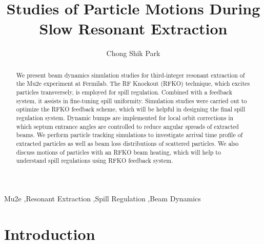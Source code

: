 \documentclass[review,1p,number,fleqn,a4paper]{elsarticle}
\begin{document}
\let\WriteBookmarks\relax
\def\floatpagepagefraction{1}
\def\textpagefraction{.001}

\title{Studies of Particle Motions During Slow Resonant Extraction}
\author[1,2]{Chong Shik Park}



\begin{abstract}
We present beam dynamics simulation studies for third-integer resonant extraction of the Mu2e experiment at Fermilab. 
The RF Knockout (RFKO) technique, which excites particles transversely, is employed for spill regulation. Combined with a feedback system, it assists in fine-tuning spill uniformity. Simulation studies were carried out to optimize the RFKO feedback scheme, which will be helpful in designing the final spill regulation system.
Dynamic bumps are implemented for local orbit corrections in which septum entrance angles are controlled to reduce angular spreads of extracted beams. We perform particle tracking simulations to investigate arrival time profile of extracted particles as well as beam loss distributions of scattered particles. We also discuss motions of particles with an RFKO beam heating, which will help to understand spill regulations using RFKO feedback system.
\end{abstract}

\begin{keyword}
Mu2e \sep Resonant Extraction  \sep Spill Regulation \sep Beam Dynamics 
\end{keyword}

\maketitle

\clearpage
\setcounter{tocdepth}{10}
\tableofcontents

\doublespacing
\linenumbers


\section{\label{sec:intro}Introduction}
\end{document}

